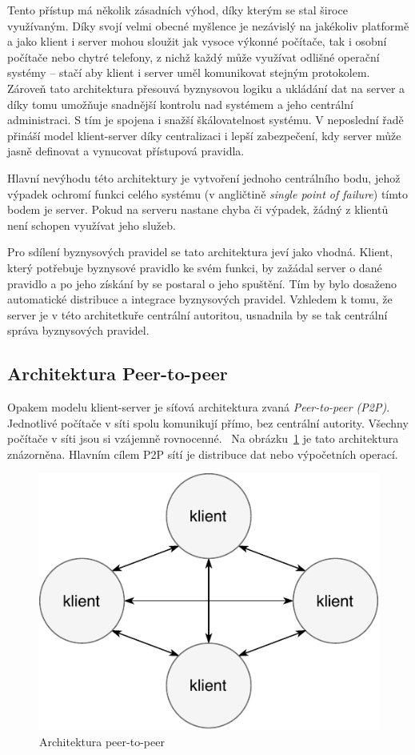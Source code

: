 Tento přístup má několik zásadních výhod, díky kterým se stal
široce využívaným. Díky svojí velmi obecné myšlence je nezávislý
na jakékoliv platformě a jako klient i server mohou sloužit
jak vysoce výkonné počítače, tak i osobní počítače nebo chytré telefony,
z nichž každý může využívat odlišné operační systémy –
stačí aby klient i server uměl komunikovat stejným protokolem.
Zároveň tato architektura přesouvá byznysovou logiku a
ukládání dat na server a díky tomu umožňuje
snadnější kontrolu nad systémem a jeho centrální administraci. S tím
je spojena i snažší škálovatelnost systému. V neposlední řadě
přináší model klient-server díky centralizaci i lepší zabezpečení,
kdy server může jasně definovat a vynucovat přístupová pravidla.

Hlavní nevýhodu této architektury je vytvoření jednoho centrálního bodu,
jehož výpadek ochromí funkci celého systému (v angličtině
\textit{single point of failure}) \textendash\xspace tímto bodem je server.
Pokud na serveru nastane chyba či výpadek, žádný z klientů není schopen využívat
jeho služeb.

Pro sdílení byznysových pravidel se tato architektura jeví
jako vhodná. Klient, který potřebuje byznysové pravidlo ke
svém funkci, by zažádal server o dané pravidlo a po jeho získání by
se postaral o jeho spuštění. Tím by bylo dosaženo automatické
distribuce a integrace byznysových pravidel. Vzhledem k tomu,
že server je v této architetkuře centrální autoritou, usnadnila
by se tak centrální správa byznysových pravidel.

\subsection{Architektura Peer-to-peer}\label{sec:p2p}

Opakem modelu klient-server je síťová architektura zvaná \textit{Peer-to-peer (\gls{P2P})}.
Jednotlivé počítače v síti spolu komunikují přímo, bez centrální autority.
Všechny počítače v síti jsou si vzájemně rovnocenné.~\cite{fox2001peer}
Na obrázku~\ref{fig:peer-to-peer} je tato architektura znázorněna.
Hlavním cílem \gls{P2P} sítí je distribuce dat nebo výpočetních operací.

\begin{figure}[t]
    \centering
    \includegraphics[keepaspectratio=true, width=0.4\linewidth]{figures/peer-to-peer.pdf}
    \caption{Architektura peer-to-peer}
    \label{fig:peer-to-peer}
\end{figure}


